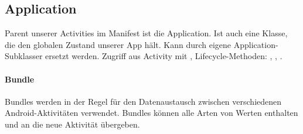 \subsection{Application}
Parent unserer Activities im Manifest ist die Application. Ist auch eine Klasse, die den globalen Zustand unserer App hält. Kann durch eigene Application-Subklasser ersetzt werden. Zugriff aus Activity mit , Lifecycle-Methoden: , , .

\paragraph{Bundle}
Bundles werden in der Regel für den Datenaustausch zwischen verschiedenen Android-Aktivitäten verwendet. Bundles können alle Arten von Werten enthalten und an die neue Aktivität übergeben.

